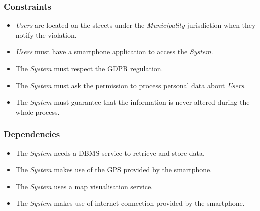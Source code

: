 \documentclass {article}
\begin{document}
		\subsubsection{Constraints}
		\begin{itemize}
		\item {\it Users} are located on the streets under the {\it Municipality} jurisdiction when they notify the violation.
		\item {\it Users} must have a smartphone application to access the {\it System}.
		\item The {\it System} must respect the GDPR regulation.
		\item The {\it System} must ask the permission to process personal data about {\it Users}.
		\item The {\it System} must guarantee that the information is never altered during the whole process. 
		\end{itemize}
		\subsubsection{Dependencies}
		\begin{itemize}
		\item The {\it System} needs a DBMS service to retrieve and store data.
		\item The {\it System} makes use of the GPS provided by the smartphone.
		\item The {\it System} uses a map visualisation service.
		\item The {\it System} makes use of internet connection provided by the smartphone.
		\end{itemize}
		
\end{document}
